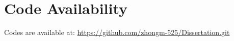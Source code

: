\chapter{Code Availability}
\label{app:code}

Codes are available at: \url{https://github.com/zhongm-525/Dissertation.git}
